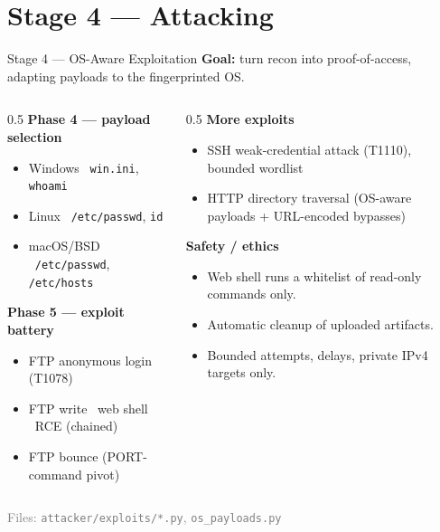 \documentclass[10pt,aspectratio=169]{beamer}
\begin{document}
\section{Stage 4 --- Attacking}
\begin{frame}{Stage 4 --- OS-Aware Exploitation}
  \textbf{Goal:} turn recon into proof-of-access, adapting payloads to the
  fingerprinted OS.
  \begin{columns}[T]
    \begin{column}{0.5\textwidth}
      \textbf{Phase 4 --- payload selection}
      \begin{itemize}
        \item Windows \textrightarrow\ \texttt{win.ini}, \texttt{whoami}
        \item Linux \textrightarrow\ \texttt{/etc/passwd}, \texttt{id}
        \item macOS/BSD \textrightarrow\ \texttt{/etc/passwd}, \texttt{/etc/hosts}
      \end{itemize}
      \textbf{Phase 5 --- exploit battery}
      \begin{itemize}
        \item FTP anonymous login (T1078)
        \item FTP write \textrightarrow\ web shell \textrightarrow\ \alert{RCE} (chained)
        \item FTP bounce (PORT-command pivot)
      \end{itemize}
    \end{column}
    \begin{column}{0.5\textwidth}
      \textbf{More exploits}
      \begin{itemize}
        \item SSH weak-credential attack (T1110), bounded wordlist
        \item HTTP directory traversal (OS-aware payloads + URL-encoded bypasses)
      \end{itemize}
      \textbf{Safety / ethics}
      \begin{itemize}
        \item Web shell runs a \alert{whitelist} of read-only commands only.
        \item Automatic cleanup of uploaded artifacts.
        \item Bounded attempts, delays, private IPv4 targets only.
      \end{itemize}
    \end{column}
  \end{columns}
  \vspace{0.3em}
  \footnotesize\textcolor{gray}{Files: \texttt{attacker/exploits/*.py}, \texttt{os\_payloads.py}}
\end{frame}
\end{document}
